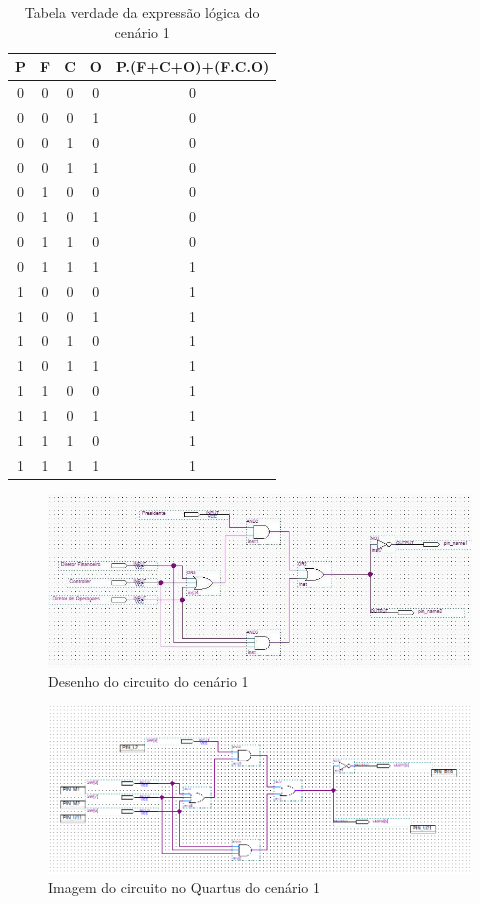 	\begin{table}[h]
		\centering
		\caption{Tabela verdade da expressão lógica do cenário 1}\label{table:tabelaVerdade1}
		\begin{tabular}{c|c|c|c|c}
			\textbf{P} & \textbf{F} & \textbf{C} & \textbf{O} & \textbf{P.(F+C+O)+(F.C.O)} \\
			\hline
			0 & 0 & 0 & 0 & 0\\\hline
			0 & 0 & 0 & 1 & 0\\\hline
			0 & 0 & 1 & 0 & 0\\\hline
			0 & 0 & 1 & 1 & 0\\\hline
			0 & 1 & 0 & 0 & 0\\\hline
			0 & 1 & 0 & 1 & 0\\\hline
			0 & 1 & 1 & 0 & 0\\\hline
			0 & 1 & 1 & 1 & 1\\\hline
			1 & 0 & 0 & 0 & 1\\\hline
			1 & 0 & 0 & 1 & 1\\\hline
			1 & 0 & 1 & 0 & 1\\\hline
			1 & 0 & 1 & 1 & 1\\\hline
			1 & 1 & 0 & 0 & 1\\\hline
			1 & 1 & 0 & 1 & 1\\\hline
			1 & 1 & 1 & 0 & 1\\\hline
			1 & 1 & 1 & 1 & 1\\

		\end{tabular}
	\end{table}

	\begin{figure}[H]
		\centering
		\caption{\label{fig:desenhoCircuito1}Desenho do circuito do cenário 1}
		\includegraphics[width=1\textwidth]{img/cenario1/desenhoCircuito}
	\end{figure}

	\begin{figure}[H]
		\centering
		\caption{\label{fig:printCircuito1}Imagem do circuito no Quartus do cenário 1}
		\includegraphics[width=1\textwidth]{img/cenario1/printCircuito}
	\end{figure}

